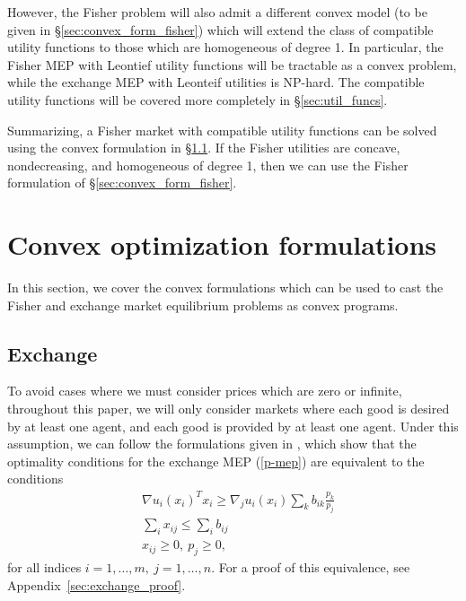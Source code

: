 \documentclass[12pt]{article}
\begin{document}
However, the Fisher problem will also admit a different convex model (to be
given in \S\ref{sec:convex_form_fisher}) which will extend the class of
compatible utility functions to those which are homogeneous of degree 1.
In particular, the Fisher MEP with
Leontief utility functions will be tractable as a convex problem, while the
exchange MEP with Leonteif utilities is NP-hard. The compatible utility
functions will be covered more completely in \S\ref{sec:util_funcs}.

Summarizing, a Fisher market with compatible utility functions can be solved
using the convex formulation in \S\ref{sec:convex_form_exchange}. If the Fisher
utilities are concave, nondecreasing, and homogeneous of degree 1, then we can
use the Fisher formulation of \S\ref{sec:convex_form_fisher}.


\section{Convex optimization formulations}
\label{sec:convex_form}
In this section, we cover the convex formulations which can be used to cast
the Fisher and exchange market equilibrium problems as convex programs.

\subsection{Exchange}
\label{sec:convex_form_exchange}

To avoid cases where we must consider prices which are zero or infinite,
throughout this paper, we will only consider markets where each good is desired
by at least one agent, and each good is provided by at least one agent. Under
this assumption, we can follow the formulations given in
\cite{jain2007polynomial, chen2007note, nenakov1983algorithm}, which show that
the optimality conditions for  the exchange MEP (\ref{p-mep}) are equivalent to
the conditions
\begin{equation}
\begin{array}{ll}
& \nabla u_i(x_i)^T x_i \geq  \nabla_j u_i(x_i) \sum_k b_{ik} \frac{p_k}{p_j}\\
& \sum_i x_{ij} \leq \sum_i b_{ij}\\
& x_{ij} \geq 0,\ p_j \geq 0,
\end{array}
\label{p-exchange-gp}
\end{equation}
for all indices $i=1,\ldots,m,\ j=1,\ldots,n$.
For a proof of this equivalence, see Appendix~\ref{sec:exchange_proof}.
\end{document}
